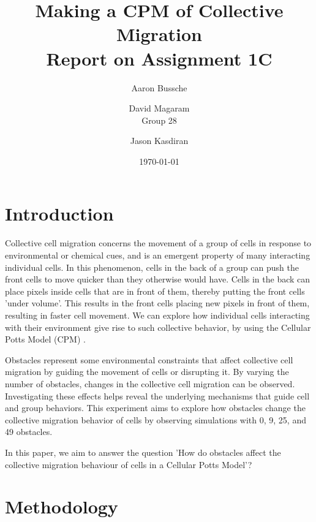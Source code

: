 \documentclass{article}
\title{Making a CPM of Collective Migration\\[0.3em] \large Report on Assignment 1C}
\author{Aaron Bussche \and  David Magaram\\[0.3em] Group 28 \and Jason Kasdiran}
\date{\today}
\begin{document}
\maketitle




\section{Introduction}

Collective cell migration concerns the movement of a group of cells in response to environmental or chemical cues, and is an 
emergent property of many interacting individual cells. In this phenomenon, cells in the back of a group can push the front cells to move quicker than they otherwise would have. Cells in the back can place pixels inside cells that are in front of them, thereby putting the front cells 'under volume'. This results in the front cells placing new pixels in front of them, resulting in faster cell movement. We can explore how individual cells interacting with their environment give rise to such collective behavior, by using the Cellular Potts Model (CPM) \cite{graner1992}.

Obstacles represent some environmental constraints that affect collective cell migration by guiding the movement of cells or disrupting it. By varying the number of obstacles, changes in the collective cell migration can be observed. Investigating these effects helps reveal the underlying mechanisms that guide cell and group behaviors. This experiment aims to explore how obstacles change the collective migration behavior of cells by observing simulations with 0, 9, 25, and 49 obstacles.

In this paper, we aim to answer the question 'How do obstacles affect the collective migration behaviour of cells in a Cellular Potts Model'?



\section{Methodology}
\end{document}
